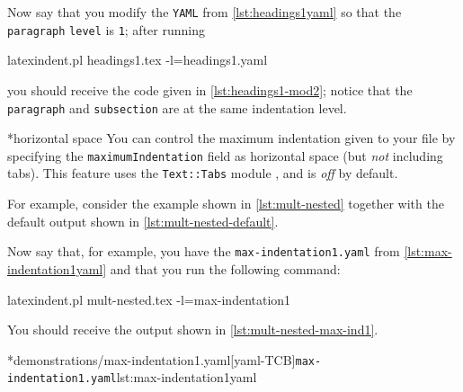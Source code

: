 	Now say that you modify the \texttt{YAML} from \cref{lst:headings1yaml} so that the \texttt{paragraph} \texttt{level} is \texttt{1}; after
	running
	\begin{commandshell}
latexindent.pl headings1.tex -l=headings1.yaml
\end{commandshell}
	you should receive the code given in \cref{lst:headings1-mod2}; notice that
	the \texttt{paragraph} and \texttt{subsection} are at the same indentation level.

*{horizontal space}
	You can control the maximum indentation given to your file by%
	specifying the \texttt{maximumIndentation} field as horizontal space (but \emph{not} including tabs).
	This feature uses the \texttt{Text::Tabs} module \cite{texttabs}, and is \emph{off}
	by default.

	For example, consider the example shown in \cref{lst:mult-nested} together with the default output
	shown in \cref{lst:mult-nested-default}.

	\begin{minipage}{.45\textwidth}
	\end{minipage}%
	\hfill
	\begin{minipage}{.45\textwidth}
	\end{minipage}

	Now say that, for example, you have the \texttt{max-indentation1.yaml} from \cref{lst:max-indentation1yaml} and
	that you run the following command:
	\begin{commandshell}
latexindent.pl mult-nested.tex -l=max-indentation1
    \end{commandshell}
	You should receive the output shown in \cref{lst:mult-nested-max-ind1}.

	\begin{minipage}{.45\textwidth}
		\cmhlistingsfromfile[style=yaml-LST]*{demonstrations/max-indentation1.yaml}[yaml-TCB]{\texttt{max-indentation1.yaml}}{lst:max-indentation1yaml}
	\end{minipage}%
	\hfill
	\begin{minipage}{.45\textwidth}
	\end{minipage}

